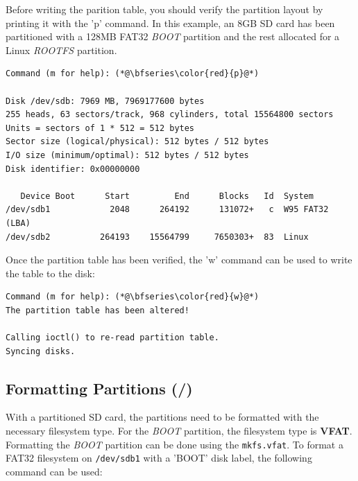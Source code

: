 

Before writing the parition table, you should verify the partition layout by printing it with the 'p' command. In this example, an 8GB SD card has been partitioned with a 128MB FAT32 \textit{BOOT} partition and the rest allocated for a Linux \textit{ROOTFS} partition.


\begin{lstlisting}[style=text]
Command (m for help): (*@\bfseries\color{red}{p}@*)

Disk /dev/sdb: 7969 MB, 7969177600 bytes
255 heads, 63 sectors/track, 968 cylinders, total 15564800 sectors
Units = sectors of 1 * 512 = 512 bytes
Sector size (logical/physical): 512 bytes / 512 bytes
I/O size (minimum/optimal): 512 bytes / 512 bytes
Disk identifier: 0x00000000

   Device Boot      Start         End      Blocks   Id  System
/dev/sdb1            2048      264192      131072+   c  W95 FAT32 (LBA)
/dev/sdb2          264193    15564799     7650303+  83  Linux
\end{lstlisting}


Once the partition table has been verified, the 'w' command can be used to write the table to the disk:


\begin{lstlisting}[style=text]
Command (m for help): (*@\bfseries\color{red}{w}@*)
The partition table has been altered!

Calling ioctl() to re-read partition table.
Syncing disks.
\end{lstlisting}


\subsection{Formatting Partitions (/)}
With a partitioned SD card, the partitions need to be formatted with the necessary filesystem type. For the \textit{BOOT} partition, the filesystem type is \textbf{VFAT}. Formatting the \textit{BOOT} partition can be done using the \texttt{mkfs.vfat}. To format a FAT32 filesystem on \texttt{/dev/sdb1} with a 'BOOT' disk label, the following command can be used:


